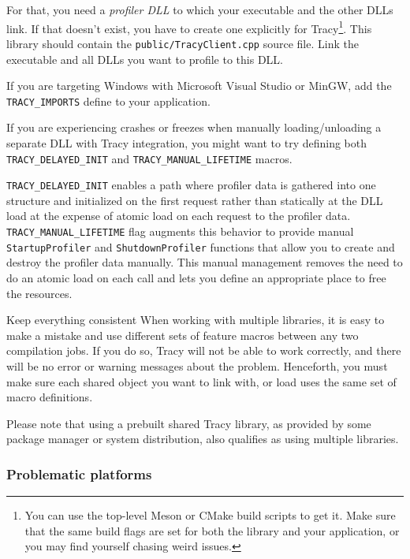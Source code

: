\documentclass[hidelinks,titlepage,a4paper,twoside]{article}
\begin{document}
For that, you need a \emph{profiler DLL} to which your executable and the other DLLs link. If that doesn't exist, you have to create one explicitly for Tracy\footnote{You can use the top-level Meson or CMake build scripts to get it. Make sure that the same build flags are set for both the library and your application, or you may find yourself chasing weird issues.}. This library should contain the \texttt{public/TracyClient.cpp} source file. Link the executable and all DLLs you want to profile to this DLL.

If you are targeting Windows with Microsoft Visual Studio or MinGW, add the \texttt{TRACY\_IMPORTS} define to your application.

If you are experiencing crashes or freezes when manually loading/unloading a separate DLL with Tracy integration, you might want to try defining both \texttt{TRACY\_DELAYED\_INIT} and \texttt{TRACY\_MANUAL\_LIFETIME} macros.

\texttt{TRACY\_DELAYED\_INIT} enables a path where profiler data is gathered into one structure and initialized on the first request rather than statically at the DLL load at the expense of atomic load on each request to the profiler data. \texttt{TRACY\_MANUAL\_LIFETIME} flag augments this behavior to provide manual \texttt{StartupProfiler} and \texttt{ShutdownProfiler} functions that allow you to create and destroy the profiler data manually. This manual management removes the need to do an atomic load on each call and lets you define an appropriate place to free the resources.

\begin{bclogo}[
noborder=true,
couleur=black!5,
logo=\bcbombe
]{Keep everything consistent}
When working with multiple libraries, it is easy to make a mistake and use different sets of feature macros between any two compilation jobs. If you do so, Tracy will not be able to work correctly, and there will be no error or warning messages about the problem. Henceforth, you must make sure each shared object you want to link with, or load uses the same set of macro definitions.

Please note that using a prebuilt shared Tracy library, as provided by some package manager or system distribution, also qualifies as using multiple libraries.
\end{bclogo}

\subsubsection{Problematic platforms}
\end{document}

